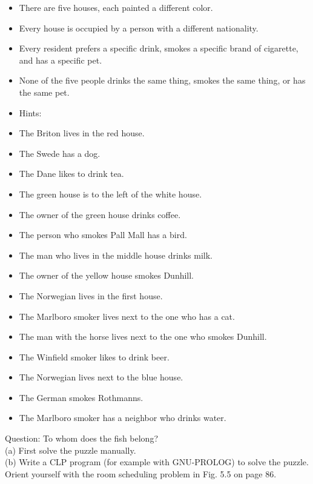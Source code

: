 \documentclass[10pt]{book}
\begin{document}
\begin{itemize}
  \item There are five houses, each painted a different color.
  \item Every house is occupied by a person with a different nationality.
  \item Every resident prefers a specific drink, smokes a specific brand of cigarette, and has a specific pet.
  \item None of the five people drinks the same thing, smokes the same thing, or has the same pet.
  \item Hints:
  \item The Briton lives in the red house.
  \item The Swede has a dog.
  \item The Dane likes to drink tea.
  \item The green house is to the left of the white house.
  \item The owner of the green house drinks coffee.
  \item The person who smokes Pall Mall has a bird.
  \item The man who lives in the middle house drinks milk.
  \item The owner of the yellow house smokes Dunhill.
  \item The Norwegian lives in the first house.
  \item The Marlboro smoker lives next to the one who has a cat.
  \item The man with the horse lives next to the one who smokes Dunhill.
  \item The Winfield smoker likes to drink beer.
  \item The Norwegian lives next to the blue house.
  \item The German smokes Rothmanns.
  \item The Marlboro smoker has a neighbor who drinks water.
\end{itemize}
Question: To whom does the fish belong?\\
(a) First solve the puzzle manually.\\
(b) Write a CLP program (for example with GNU-PROLOG) to solve the puzzle. Orient yourself with the room scheduling problem in Fig. 5.5 on page 86.
\end{document}
